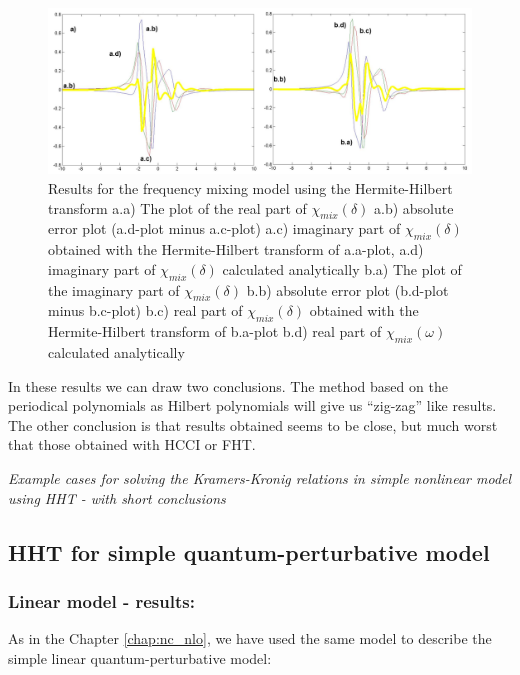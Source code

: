 \documentclass[12pt,twoside,a4paper]{article}
\numberwithin{equation}{subsection}
\numberwithin{figure}{subsection}
\begin{document}
\begin{figure} 
  \includegraphics[width=150mm]{img/hht_fmix.png}
  \caption{Results for the frequency mixing model using the Hermite-Hilbert transform
     a.a) The plot of the real part of ${\chi_{mix}}(\delta )$
     a.b) absolute error plot (a.d-plot minus a.c-plot)
     a.c) imaginary part of ${\chi_{mix}}(\delta )$ obtained with the Hermite-Hilbert transform of a.a-plot, 
     a.d) imaginary part of ${\chi_{mix}}(\delta )$ calculated analytically 
     b.a) The plot of the imaginary part of ${\chi_{mix}}(\delta )$ 
     b.b) absolute error plot (b.d-plot minus b.c-plot)
     b.c) real part of ${\chi_{mix}}(\delta )$ obtained with the Hermite-Hilbert transform of b.a-plot  
     b.d) real part of $\chi_{mix} (\omega )$ calculated analytically 
     \label{fig:hht_fmix}
     }
\end{figure}

In these results we can draw two conclusions. The method based on the periodical polynomials as Hilbert polynomials will
give us ``zig-zag'' like results. The other conclusion is that results obtained seems to be close, but much worst that those
obtained with HCCI or FHT. 

\textit{Example cases for solving the Kramers-Kronig relations in simple nonlinear model using HHT - with short conclusions}

\subsection{HHT for simple quantum-perturbative model} \label{chap:hermite_quantum}

\subsubsection*{Linear model - results:}

As in the Chapter \ref{chap:nc_nlo}, we have used the same model to describe the simple linear quantum-perturbative model: 
\end{document}
